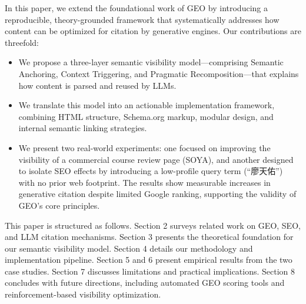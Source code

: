 In this paper, we extend the foundational work of GEO by introducing a reproducible, theory-grounded framework that systematically addresses how content can be optimized for citation by generative engines. Our contributions are threefold:
\begin{itemize}
  \item We propose a three-layer semantic visibility model—comprising Semantic Anchoring, Context Triggering, and Pragmatic Recomposition—that explains how content is parsed and reused by LLMs.
  \item We translate this model into an actionable implementation framework, combining HTML structure, Schema.org markup, modular design, and internal semantic linking strategies.
  \item We present two real-world experiments: one focused on improving the visibility of a commercial course review page (SOYA), and another designed to isolate SEO effects by introducing a low-profile query term (``廖天佑'') with no prior web footprint. The results show measurable increases in generative citation despite limited Google ranking, supporting the validity of GEO’s core principles.
\end{itemize}

This paper is structured as follows. Section 2 surveys related work on GEO, SEO, and LLM citation mechanisms. Section 3 presents the theoretical foundation for our semantic visibility model. Section 4 details our methodology and implementation pipeline. Section 5 and 6 present empirical results from the two case studies. Section 7 discusses limitations and practical implications. Section 8 concludes with future directions, including automated GEO scoring tools and reinforcement-based visibility optimization.
